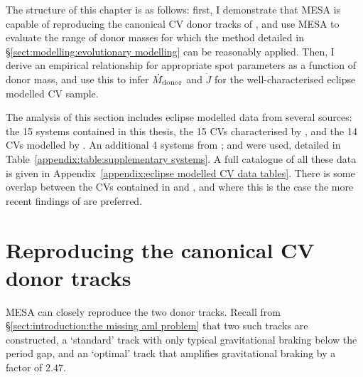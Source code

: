 
\label{chpt:Mass loss and Angular momentum loss in short period CVs} %

The structure of this chapter is as follows: first, I demonstrate that MESA is capable of reproducing the canonical CV donor tracks of \citet{knigge11}, and use MESA to evaluate the range of donor masses for which the method detailed in \S\ref{sect:modelling:evolutionary modelling} can be reasonably applied.
Then, I derive an empirical relationship for appropriate spot parameters as a function of donor mass, and use this to infer $\dot M_{\rm donor}$ and $\dot J$ for the well-characterised eclipse modelled CV sample.

The analysis of this section includes eclipse modelled data from several sources: the 15 systems contained in this thesis, the 15 CVs characterised by \citet{McAllister2019}, and the 14 CVs modelled by \citet{Savoury2011}. An additional 4 systems from \citet{mcallister2015,mcallister2017, mcallister2017b}; and \citet{copperwheat2010} were used, detailed in Table~\ref{appendix:table:supplementary systems}. A full catalogue of all these data is given in Appendix~\ref{appendix:eclipse modelled CV data tables}.
There is some overlap between the CVs contained in \citet{McAllister2019} and \citet{Savoury2011}, and where this is the case the more recent findings of \citet{McAllister2019} are preferred.


\section{Reproducing the canonical CV donor tracks}
\label{sect:results:reproducing K11 tracks}

MESA can closely reproduce the two \citet{knigge11} donor tracks. Recall from \S\ref{sect:introduction:the missing aml problem} that two such tracks are constructed, a `standard' track with only typical gravitational braking below the period gap, and an `optimal' track that amplifies gravitational braking by a factor of $2.47$.

